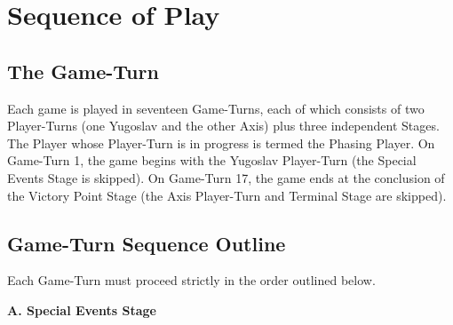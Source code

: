 \section{Sequence of Play}\label{sec:4.0}

\subsection{The Game-Turn}\label{sec:4.1}

Each game is played in seventeen Game-Turns, each of which consists of two
Player-Turns (one Yugoslav and the other Axis) plus three independent Stages.
The Player whose Player-Turn is in progress is termed the Phasing Player. On
Game-Turn 1, the game begins with the Yugoslav Player-Turn (the Special Events
Stage is skipped). On Game-Turn 17, the game ends at the conclusion of the
Victory Point Stage (the Axis Player-Turn and Terminal Stage are skipped).

\subsection{Game-Turn Sequence Outline}\label{sec:4.2}

Each Game-Turn must proceed strictly in the order outlined below.

\textbf{A. Special Events Stage}

